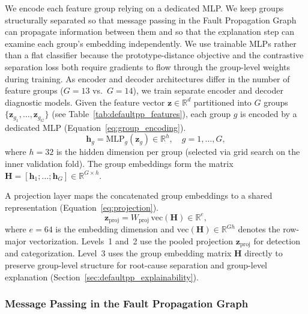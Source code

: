 We encode each feature group relying on a dedicated MLP. We keep groups structurally separated so that message passing in the Fault Propagation Graph can propagate information between them and so that the explanation step can examine each group's embedding independently. We use trainable MLPs rather than a flat classifier because the prototype-distance objective and the contrastive separation loss both require gradients to flow through the group-level weights during training. As encoder and decoder architectures differ in the number of feature groups ($G = 13$ vs.\ $G = 14$), we train separate encoder and decoder diagnostic models. Given the feature vector $\mathbf{z} \in \mathbb{R}^d$ partitioned into $G$ groups $\{\mathbf{z}_{g_1}, \ldots, \mathbf{z}_{g_G}\}$ (see Table~\ref{tab:defaultpp_features}), each group $g$ is encoded by a dedicated MLP (Equation~\ref{eq:group_encoding}).
\begin{equation}
\mathbf{h}_g = \text{MLP}_g(\mathbf{z}_g) \in \mathbb{R}^{h}, \quad g = 1, \ldots, G,
\label{eq:group_encoding}
\end{equation}
where $h = 32$ is the hidden dimension per group (selected via grid search on the inner validation fold). The group embeddings form the matrix $\mathbf{H} = [\mathbf{h}_1; \ldots; \mathbf{h}_G] \in \mathbb{R}^{G \times h}$.

A projection layer maps the concatenated group embeddings to a shared representation (Equation~\ref{eq:projection}).
\begin{equation}
\mathbf{z}_{\text{proj}} = W_{\text{proj}} \, \text{vec}(\mathbf{H}) \in \mathbb{R}^{e},
\label{eq:projection}
\end{equation}
where $e = 64$ is the embedding dimension and $\text{vec}(\mathbf{H}) \in \mathbb{R}^{Gh}$ denotes the row-major vectorization. Levels~1 and~2 use the pooled projection $\mathbf{z}_{\text{proj}}$ for detection and categorization. Level~3 uses the group embedding matrix $\mathbf{H}$ directly to preserve group-level structure for root-cause separation and group-level explanation (Section~\ref{sec:defaultpp_explainability}).

\subsubsection{Message Passing in the Fault Propagation Graph}
\label{sec:defaultpp_message_passing}

